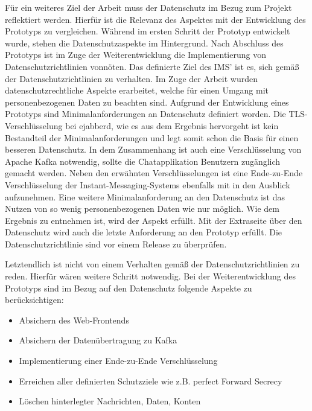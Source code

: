 \documentclass[a4paper,titlepage,halfparskip,12pt]{scrreprt}
\begin{document}
\begin{onehalfspacing}
Für ein weiteres Ziel der Arbeit muss der Datenschutz im Bezug zum Projekt reflektiert werden. Hierfür ist die Relevanz des Aspektes mit der Entwicklung des Prototyps zu vergleichen. Während im ersten Schritt der Prototyp entwickelt wurde, stehen die Datenschutzaspekte im Hintergrund. Nach Abschluss des Prototyps ist im Zuge der Weiterentwicklung die Implementierung von Datenschutzrichtlinien vonnöten. Das definierte Ziel des IMS' ist es, sich gemäß der Datenschutzrichtlinien zu verhalten. Im Zuge der Arbeit wurden datenschutzrechtliche Aspekte erarbeitet, welche für einen Umgang mit personenbezogenen Daten zu beachten sind. Aufgrund der Entwicklung eines Prototyps sind Minimalanforderungen an Datenschutz definiert worden. Die TLS-Verschlüsselung bei ejabberd, wie es aus dem Ergebnis hervorgeht ist kein Bestandteil der Minimalanforderungen und legt somit schon die Basis für einen besseren Datenschutz. In dem Zusammenhang ist auch eine Verschlüsselung von Apache Kafka notwendig, sollte die Chatapplikation Benutzern zugänglich gemacht werden. Neben den erwähnten Verschlüsselungen ist eine Ende-zu-Ende Verschlüsselung der Instant-Messaging-Systems ebenfalls mit in den Ausblick aufzunehmen. Eine weitere Minimalanforderung an den Datenschutz ist das Nutzen von so wenig personenbezogenen Daten wie nur möglich. Wie dem Ergebnis zu entnehmen ist, wird der Aspekt erfüllt. Mit der Extraseite über den Datenschutz wird auch die letzte Anforderung an den Prototyp erfüllt. Die Datenschutzrichtlinie sind vor einem Release zu überprüfen.
 
Letztendlich ist nicht von einem Verhalten gemäß der Datenschutzrichtlinien zu reden. Hierfür wären weitere Schritt notwendig. Bei der Weiterentwicklung des Prototyps sind im Bezug auf den Datenschutz folgende Aspekte zu berücksichtigen:
\begin{itemize}
	\item Absichern des Web-Frontends
	\item Absichern der Datenübertragung zu Kafka
	\item Implementierung einer Ende-zu-Ende Verschlüsselung
	\item Erreichen aller definierten Schutzziele wie z.B. perfect Forward Secrecy
	\item Löschen hinterlegter Nachrichten, Daten, Konten
\end{itemize} 







\end{onehalfspacing}
\newpage
\end{document}
